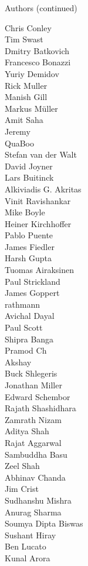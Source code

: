 \begin{frame}{Authors (continued)}
\begin{multicols}{5}
Chris Conley\\
Tim Swast\\
Dmitry Batkovich\\
Francesco Bonazzi\\
Yuriy Demidov\\
Rick Muller\\
Manish Gill\\
Markus Müller\\
Amit Saha\\
Jeremy\\
QuaBoo\\
Stefan van der Walt\\
David Joyner\\
Lars Buitinck\\
Alkiviadis G. Akritas\\
Vinit Ravishankar\\
Mike Boyle\\
Heiner Kirchhoffer\\
Pablo Puente\\
James Fiedler\\
Harsh Gupta\\
Tuomas Airaksinen\\
Paul Strickland\\
James Goppert\\
rathmann\\
Avichal Dayal\\
Paul Scott\\
Shipra Banga\\
Pramod Ch\\
Akshay\\
Buck Shlegeris\\
Jonathan Miller\\
Edward Schembor\\
Rajath Shashidhara\\
Zamrath Nizam\\
Aditya Shah\\
Rajat Aggarwal\\
Sambuddha Basu\\
Zeel Shah\\
Abhinav Chanda\\
Jim Crist\\
Sudhanshu Mishra\\
Anurag Sharma\\
Soumya Dipta Biswas\\
Sushant Hiray\\
Ben Lucato\\
Kunal Arora\\

\end{multicols}
\end{frame}
